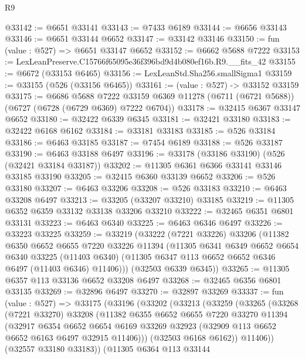 \begin{lexlean}{R9}
\begin{coremodule}
@33142 := @6651 @33141
@33143 := @7433 @6189
@33144 := @6656 @33143
@33146 := @6651 @33144 @6652
@33147 := @33142 @33146
@33150 := fun (value : @527) => @6651 @33147 @6652
@33152 := @6662 @5688 @7222
@33153 := LexLeanPreserve.C15766f65095e36f396bd9d4b080ef16b.R9.__fits_42
@33155 := @6672 (@33153 @6465)
@33156 := LexLeanStd.Sha256.smallSigma1
@33159 := @33155 (@526 (@33156 @6465))
@33161 := (value : @527) -> @33152 @33159
@33175 := @6686
    @5688
    @7222
    @33159
    @6369
    @11278
    (@6711 (@6721 @5688))
    (@6727 (@6728 (@6729 @6369) @7222 @6704))
@33178 := @32415 @6367 @33147 @6652
@33180 := @32422 @6339 @6345
@33181 := @32421 @33180
@33183 := @32422 @6168 @6162
@33184 := @33181 @33183
@33185 := @526 @33184
@33186 := @6463 @33185
@33187 := @7454 @6189
@33188 := @526 @33187
@33190 := @6463 @33188 @6497
@33196 := @33178 (@33186 @33190) (@526 (@32421 @33184 @33187))
@33202 := @11305 @6361 @6366 @33141 @33146 @33185 @33190
@33205 := @32415 @6360 @33139 @6652
@33206 := @526 @33180
@33207 := @6463 @33206
@33208 := @526 @33183
@33210 := @6463 @33208 @6497
@33213 := @33205 (@33207 @33210) @33185
@33219 := @11305 @6352 @6359 @33132 @33138 @33206 @33210
@33222 := @32465 @6351 @6801 @33131
@33223 := @6463 @6340
@33225 := @6463 @6346 @6497
@33226 := @33223 @33225
@33259 := @33219
    (@33222
      (@7221 @33226)
      @33206
      (@11382
        @6350
        @6652
        @6655
        @7220
        @33226
        @11394
        (@11305
          @6341
          @6349
          @6652
          @6654
          @6340
          @33225
          (@11403 @6340)
          (@11305 @6347 @113 @6652 @6652 @6346 @6497 (@11403 @6346) @11406)))
      (@32503 @6339 @6345))
@33265 := @11305 @6357 @113 @33136 @6652 @33208 @6497
@33268 := @32465 @6356 @6801 @33135
@33269 := @32896 @6497
@33270 := @32897 @33269
@33337 := fun (value : @527) =>
  @33175
    (@33196
      (@33202
        (@33213
          (@33259
            (@33265
              (@33268
                (@7221 @33270)
                @33208
                (@11382
                  @6355
                  @6652
                  @6655
                  @7220
                  @33270
                  @11394
                  (@32917
                    @6354
                    @6652
                    @6654
                    @6169
                    @33269
                    @32923
                    (@32909 @113 @6652 @6652 @6163 @6497 @32915 @11406)))
                (@32503 @6168 @6162))
              @11406))
          (@32557 @33180 @33183))
        (@11305
          @6364
          @113
          @33144

\end{coremodule}
\end{lexlean}
